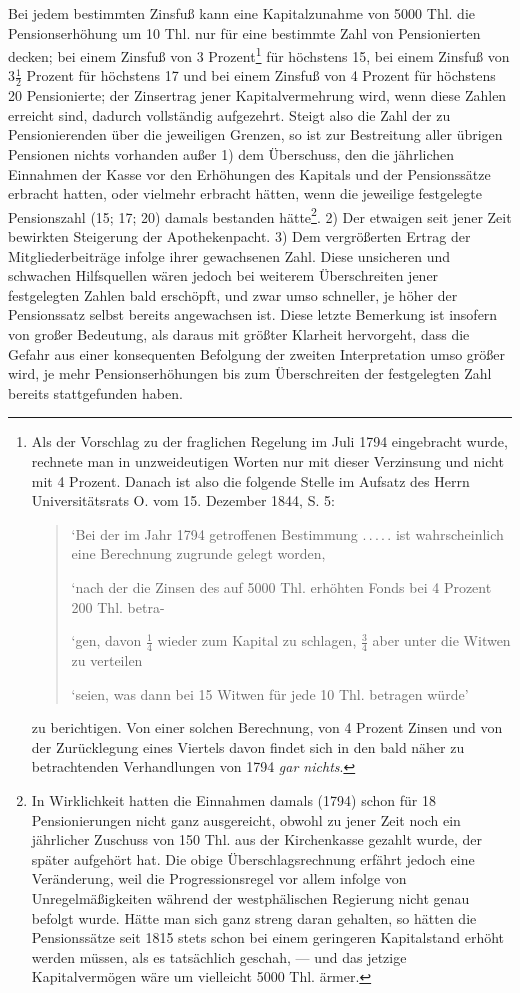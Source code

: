 Bei jedem bestimmten Zinsfuß kann eine Kapitalzunahme von 5000 Thl. die Pensionserhöhung um 10 Thl. nur für eine bestimmte Zahl von Pensionierten decken; bei einem Zinsfuß von 3 Prozent\footnote{Als der Vorschlag zu der fraglichen Regelung im Juli 1794 eingebracht wurde, rechnete man in unzweideutigen Worten nur mit dieser Verzinsung und nicht mit 4 Prozent. Danach ist also die folgende Stelle im Aufsatz des Herrn Universitätsrats O. vom 15. Dezember 1844, S. 5:
\begin{quote}\raggedright
‘Bei der im Jahr 1794 getroffenen Bestimmung .\,.\,.\,.\,. ist wahrscheinlich eine Berechnung zugrunde gelegt worden,\par
‘nach der die Zinsen des auf 5000 Thl. erhöhten Fonds bei 4 Prozent 200 Thl. betra-\par
‘gen, davon \(\tfrac14\) wieder zum Kapital zu schlagen, \(\tfrac34\) aber unter die Witwen zu verteilen\par
‘seien, was dann bei 15 Witwen für jede 10 Thl. betragen würde’
\end{quote}
zu berichtigen. Von einer solchen Berechnung, von 4 Prozent Zinsen und von der Zurücklegung eines Viertels davon findet sich in den bald näher zu betrachtenden Verhandlungen von 1794 \textit{gar nichts}.} für höchstens
15, bei einem Zinsfuß von \(3\tfrac12\) Prozent für höchstens 17 und bei einem Zinsfuß von 4 Prozent für höchstens 20 Pensionierte; der Zinsertrag jener Kapitalvermehrung wird, wenn diese Zahlen erreicht sind, dadurch vollständig aufgezehrt. Steigt also die Zahl der zu Pensionierenden über die jeweiligen Grenzen, so ist zur Bestreitung aller übrigen Pensionen nichts vorhanden außer 1) dem Überschuss, den die jährlichen Einnahmen der Kasse vor den Erhöhungen des Kapitals und der Pensionssätze erbracht hatten, oder vielmehr erbracht hätten, wenn die jeweilige festgelegte Pensionszahl (15; 17; 20) damals bestanden hätte\footnote{In Wirklichkeit hatten die Einnahmen damals (1794) schon für 18 Pensionierungen nicht ganz ausgereicht, obwohl zu jener Zeit noch ein jährlicher Zuschuss von 150 Thl. aus der Kirchenkasse gezahlt wurde, der später aufgehört hat. Die obige Überschlagsrechnung erfährt jedoch eine Veränderung, weil die Progressionsregel vor allem infolge von Unregelmäßigkeiten während der westphälischen Regierung nicht genau befolgt wurde. Hätte man sich ganz streng daran gehalten, so hätten die Pensionssätze seit 1815 stets schon bei einem geringeren Kapitalstand erhöht werden müssen, als es tatsächlich geschah, — und das jetzige Kapitalvermögen wäre um vielleicht 5000 Thl. ärmer.}. 2) Der etwaigen seit jener Zeit bewirkten Steigerung der Apothekenpacht. 3) Dem vergrößerten Ertrag der Mitgliederbeiträge infolge ihrer gewachsenen Zahl. Diese unsicheren und schwachen Hilfsquellen wären jedoch bei weiterem Überschreiten jener festgelegten Zahlen bald erschöpft, und zwar umso schneller, je höher der Pensionssatz selbst bereits angewachsen ist. Diese letzte Bemerkung ist insofern von großer Bedeutung, als daraus mit größter Klarheit hervorgeht, dass die Gefahr aus einer konsequenten Befolgung der zweiten Interpretation umso größer wird, je mehr Pensionserhöhungen bis zum Überschreiten der festgelegten Zahl bereits stattgefunden haben.

